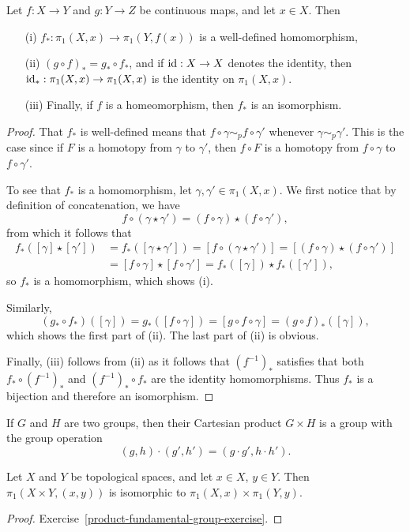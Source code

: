 \begin{thm}
  Let $f : X \to Y$ and $g : Y \to Z$ be continuous maps, and let $x \in X$. Then
  \begin{itemize}
    \item[(i)] $f_*: \pi_1(X,x) \to \pi_1(Y,f(x))$ is a well-defined homomorphism,
    \item[(ii)] $(g \circ f)_* = g_* \circ f_*$, and if $\mathrm{id} : X \to X$ denotes the identity, then $\mathrm{id}_* : \pi_1(X,x) \to \pi_1(X,x)$ is the identity on $\pi_1(X,x)$.
    \item[(iii)] Finally, if $f$ is a homeomorphism, then $f_*$ is an isomorphism.
  \end{itemize}
\end{thm}
\begin{proof}
  That $f_*$ is well-defined means that $f \circ \gamma \sim_p f \circ \gamma'$ whenever $\gamma \sim_p \gamma'$. This is the case since if $F$ is a homotopy from $\gamma$ to $\gamma'$, then $f \circ F$ is a homotopy from $f \circ \gamma$ to $f \circ \gamma'$.
  
  To see that $f_*$ is a homomorphism, let $\gamma, \gamma' \in \pi_1(X,x)$. We first notice that by definition of concatenation, we have
  \[
    f \circ ( \gamma \star \gamma') = (f \circ \gamma) \star (f \circ \gamma'),
  \]
  from which it follows that
  \begin{align*}
    f_*([\gamma] \star [\gamma']) &= f_*([\gamma \star \gamma']) = [f \circ (\gamma \star \gamma')] = [(f \circ \gamma) \star (f \circ \gamma')] \\
      &= [ f \circ \gamma] \star [f \circ \gamma'] = f_*([\gamma]) \star f_*([\gamma']),
  \end{align*}
  so $f_*$ is a homomorphism, which shows (i).
  
  Similarly,
  \[
    (g_* \circ f_*)([\gamma]) = g_* ( [f \circ \gamma]) = [g \circ f \circ \gamma] = (g \circ f)_*([\gamma]),
  \]
  which shows the first part of (ii). The last part of (ii) is obvious.
  
  Finally, (iii) follows from (ii) as it follows that $(f^{-1})_*$ satisfies that both $f_* \circ (f^{-1})_*$ and $(f^{-1})_* \circ f_*$ are the identity homomorphisms. Thus $f_*$ is a bijection and therefore an isomorphism.
\end{proof} 

If $G$ and $H$ are two groups, then their Cartesian product $G \times H$ is a group with the group operation
\[
  (g,h) \cdot (g',h') = (g\cdot g', h \cdot h').
\]
\begin{prop}
  \label{product-fundamental-group}
  Let $X$ and $Y$ be topological spaces, and let $x \in X$, $y \in Y$. Then $\pi_1(X \times Y,(x,y))$ is isomorphic to $\pi_1(X,x) \times \pi_1(Y,y)$.
\end{prop}
\begin{proof}
  Exercise~\ref{product-fundamental-group-exercise}.
\end{proof}

